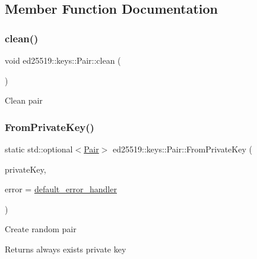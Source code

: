 \subsection{Member Function Documentation}
\mbox{\label{classed25519_1_1keys_1_1_pair_ae803e41096e0f6edb030e48713515aa2}} 
\subsubsection{\texorpdfstring{clean()}{clean()}}
{\footnotesize\ttfamily void ed25519\+::keys\+::\+Pair\+::clean (\begin{DoxyParamCaption}{ }\end{DoxyParamCaption})}

Clean pair \mbox{\label{classed25519_1_1keys_1_1_pair_aa4b34f7823cbba1e4243b9fbf2745e1e}} 
\subsubsection{\texorpdfstring{From\+Private\+Key()}{FromPrivateKey()}}
{\footnotesize\ttfamily static std\+::optional$<$\mbox{\hyperlink{classed25519_1_1keys_1_1_pair}{Pair}}$>$ ed25519\+::keys\+::\+Pair\+::\+From\+Private\+Key (\begin{DoxyParamCaption}\item[{const std\+::string \&}]{private\+Key,  }\item[{const \mbox{\hyperlink{namespaceed25519_a6ba572942b3c18591fc869d52a6b16e6}{Error\+Handler}} \&}]{error = {\ttfamily \mbox{\hyperlink{namespaceed25519_a7c7bb6ed17541162959c33ed3e3b15fb}{default\+\_\+error\+\_\+handler}}} }\end{DoxyParamCaption})\hspace{0.3cm}{\ttfamily [static]}}

Create random pair \begin{DoxyReturn}{Returns}
always exists private key 
\end{DoxyReturn}
\mbox{\label{classed25519_1_1keys_1_1_pair_add9c9587c53dff8b1d5bc69a7a97f837}} 

